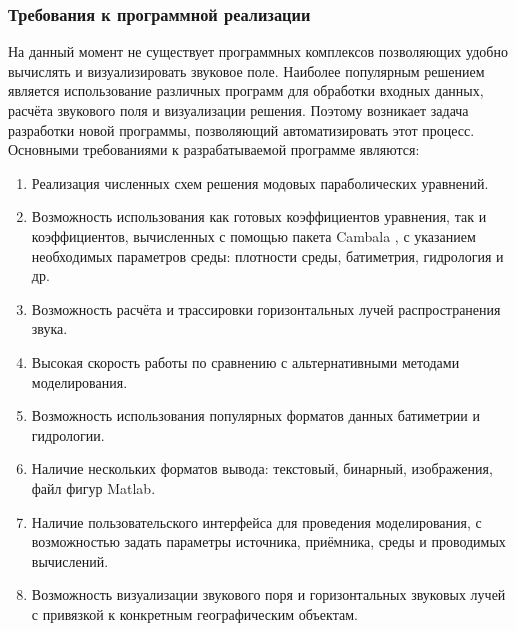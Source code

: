 \documentclass[../document.tex]{subfiles}
\begin{document}
        \subsubsection{Требования к программной реализации}
            \par На данный момент не существует программных комплексов позволяющих удобно вычислять и визуализировать звуковое поле. Наиболее популярным решением является использование различных программ для обработки входных данных, расчёта звукового поля и визуализации решения. Поэтому возникает задача разработки новой программы, позволяющий автоматизировать этот процесс. Основными требованиями к разрабатываемой программе являются:
            \begin{enumerate}
                \item Реализация численных схем решения модовых параболических уравнений.
                \item Возможность использования как готовых коэффициентов уравнения, так
и коэффициентов, вычисленных с помощью пакета Cambala \cite{cambala}, с указанием необхо­димых параметров среды: плотности среды, батиметрия, гидрология и др.
                \item Возможность расчёта и трассировки горизонтальных лучей распространения звука.
                \item Высокая скорость работы по сравнению с альтернативными методами моделирования.
                \item Возможность использования популярных форматов данных батиметрии и гидрологии.
                \item Наличие нескольких форматов вывода: текстовый, бинарный, изображения, файл фигур Matlab.
                \item Наличие пользовательского интерфейса для проведения моделирования, с возможностью задать параметры источника, приёмника, среды и проводимых вычислений.
                \item Возможность визуализации звукового поря и горизонтальных звуковых лучей с привязкой к конкретным географическим объектам.
            \end{enumerate}
\end{document}
